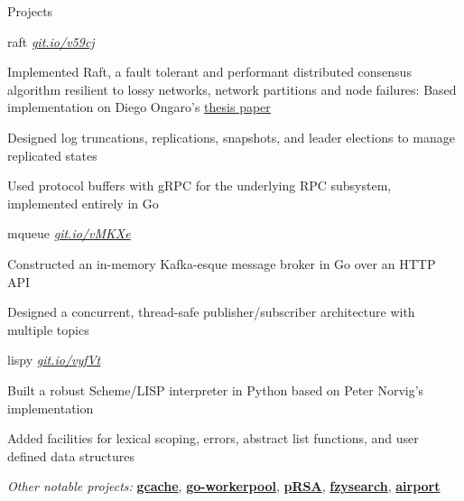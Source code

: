 \documentclass{resume} %
\begin{document}
\begin{rSection}{Projects}
  
  \begin{rSubsection}{raft}
	  {\em {\href{http://github.com/ridwanmsharif/raft}
		    {git.io/v59cj}}}
	  {}

    \item Implemented Raft, a fault tolerant and performant distributed
      consensus algorithm resilient to lossy networks, network partitions and
      node failures: Based implementation on Diego Ongaro's
      \href{https://raft.github.io/raft.pdf}{\underline{thesis paper}}
    \item Designed log truncations, replications, snapshots, and leader
      elections to manage replicated states
    \item Used protocol buffers with gRPC for the underlying RPC subsystem,
      implemented entirely in Go
      
  \end{rSubsection}

  \begin{rSubsection}{mqueue}
	  {\em {\href{http://github.com/ridwanmsharif/mqueue}
		    {git.io/vMKXe}}}
	  {}

    \item Constructed an in-memory Kafka-esque message broker in Go over an HTTP API
    \item Designed a concurrent, thread-safe publisher/subscriber architecture
      with multiple topics
  \end{rSubsection}

  \begin{rSubsection}{lispy}
	  {\em {\href{http://github.com/ridwanmsharif/lispy}
		    {git.io/vyfVt}}}
	  {}

    \item Built a robust Scheme/LISP interpreter in Python based on Peter
      Norvig's implementation
    \item Added facilities for lexical scoping, errors, abstract list
      functions, and user defined data structures
  \end{rSubsection}

  \begin{rMinisection}
    \item {\em Other notable projects:}
      \href{https://github.com/ridwanmsharif/cache}{\textbf{gcache}},
      \href{https://github.com/ridwanmsharif/goworkerpool}{\textbf{go-workerpool}},
      \href{https://github.com/ridwanmsharif/prsa}{\textbf{pRSA}},
      \href{https://github.com/ridwanmsharif/fzysearch}{\textbf{fzysearch}},
      \href{https://github.com/ridwanmsharif/airport}{\textbf{airport}}
  \end{rMinisection}
\end{rSection}
\end{document}
